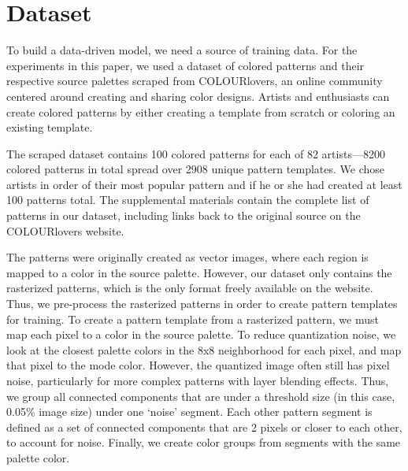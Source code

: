 \section{Dataset}
\label{sec:dataset}

To build a data-driven model, we need a source of training data. For the experiments in this paper, we used a dataset of colored patterns and their respective source palettes scraped from COLOURlovers, an online community centered around creating and sharing color designs. Artists and enthusiasts can create colored patterns by either creating a template from scratch or coloring an existing template. 

The scraped dataset contains 100 colored patterns for each of 82 artists---8200 colored patterns in total spread over 2908 unique pattern templates. We chose artists in order of their most popular pattern and if he or she had created at least 100 patterns total. The supplemental materials contain the complete list of patterns in our dataset, including links back to the original source on the COLOURlovers website.

The patterns were originally created as vector images, where each region is mapped to a color in the source palette. However, our dataset only contains the rasterized patterns, which is the only format freely available on the website. Thus, we pre-process the rasterized patterns in order to create pattern templates for training. To create a pattern template from a rasterized pattern, we must map each pixel to a color in the source palette. To reduce quantization noise, we look at the closest palette colors in the 8x8 neighborhood for each pixel, and map that pixel to the mode color. However, the quantized image often still has pixel noise, particularly for more complex patterns with layer blending effects. Thus, we group all connected components that are under a threshold size (in this case, 0.05\% image size) under one `noise' segment. Each other pattern segment is defined as a set of connected components that are 2 pixels or closer to each other, to account for noise. Finally, we create color groups from segments with the same palette color.